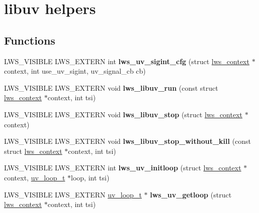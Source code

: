 \hypertarget{group__uv}{}\section{libuv helpers}
\label{group__uv}
\subsection*{Functions}
\begin{DoxyCompactItemize}
\item 
\mbox{\label{group__uv_ga99099e045993383f251a8026e1e40414}} 
L\+W\+S\+\_\+\+V\+I\+S\+I\+B\+LE L\+W\+S\+\_\+\+E\+X\+T\+E\+RN int {\bfseries lws\+\_\+uv\+\_\+sigint\+\_\+cfg} (struct \hyperlink{structlws__context}{lws\+\_\+context} $\ast$context, int use\+\_\+uv\+\_\+sigint, uv\+\_\+signal\+\_\+cb cb)
\item 
\mbox{\label{group__uv_ga097c89497824d4de225a85a00661fc89}} 
L\+W\+S\+\_\+\+V\+I\+S\+I\+B\+LE L\+W\+S\+\_\+\+E\+X\+T\+E\+RN void {\bfseries lws\+\_\+libuv\+\_\+run} (const struct \hyperlink{structlws__context}{lws\+\_\+context} $\ast$context, int tsi)
\item 
\mbox{\label{group__uv_ga3c75cd6ec3f80fc0a0c8ead4c4e71a15}} 
L\+W\+S\+\_\+\+V\+I\+S\+I\+B\+LE L\+W\+S\+\_\+\+E\+X\+T\+E\+RN void {\bfseries lws\+\_\+libuv\+\_\+stop} (struct \hyperlink{structlws__context}{lws\+\_\+context} $\ast$context)
\item 
\mbox{\label{group__uv_gaa17758e1f852017a2271d8fb3e9305aa}} 
L\+W\+S\+\_\+\+V\+I\+S\+I\+B\+LE L\+W\+S\+\_\+\+E\+X\+T\+E\+RN void {\bfseries lws\+\_\+libuv\+\_\+stop\+\_\+without\+\_\+kill} (const struct \hyperlink{structlws__context}{lws\+\_\+context} $\ast$context, int tsi)
\item 
\mbox{\label{group__uv_gad85ce3bfc53ff754988d36bf5de39e21}} 
L\+W\+S\+\_\+\+V\+I\+S\+I\+B\+LE L\+W\+S\+\_\+\+E\+X\+T\+E\+RN int {\bfseries lws\+\_\+uv\+\_\+initloop} (struct \hyperlink{structlws__context}{lws\+\_\+context} $\ast$context, \hyperlink{structuv__loop__s}{uv\+\_\+loop\+\_\+t} $\ast$loop, int tsi)
\item 
\mbox{\label{group__uv_gab7e95992dbf69808cb684a5d51e57214}} 
L\+W\+S\+\_\+\+V\+I\+S\+I\+B\+LE L\+W\+S\+\_\+\+E\+X\+T\+E\+RN \hyperlink{structuv__loop__s}{uv\+\_\+loop\+\_\+t} $\ast$ {\bfseries lws\+\_\+uv\+\_\+getloop} (struct \hyperlink{structlws__context}{lws\+\_\+context} $\ast$context, int tsi)

\end{DoxyCompactItemize}
